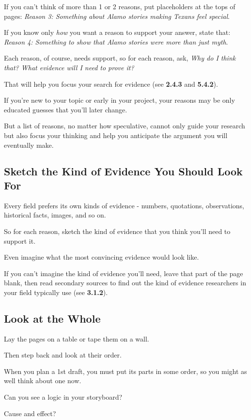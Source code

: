 \documentclass[oneside]{book}
\numberwithin{equation}{section}
\begin{document}
%
If you can't think of more than 1 or 2 reasons, put placeholders at the tops of pages: \textit{Reason 3: Something about Alamo stories making Texans feel special}.

If you know only \textit{how} you want a reason to support your answer, state that: \textit{Reason 4: Something to show that Alamo stories were more than just myth}.

Each reason, of course, needs support, so for each reason, ask, \textit{Why do I think that? What evidence will I need to prove it?}

That will help you focus your search for evidence (see \textbf{2.4.3} and \textbf{5.4.2}).

%
If you're new to your topic or early in your project, your reasons may be only educated guesses that you'll later change.

But a list of reasons, no matter how speculative, cannot only guide your research but also focus your thinking and help you anticipate the argument you will eventually make.

\subsection{Sketch the Kind of Evidence You Should Look For}
Every field prefers its own kinds of evidence - numbers, quotations, observations, historical facts, images, and so on.

So for each reason, sketch the kind of evidence that you think you'll need to support it.

Even imagine what the most convincing evidence would look like.

If you can't imagine the kind of evidence you'll need, leave that part of the page blank, then read secondary sources to find out the kind of evidence researchers in your field typically use (see \textbf{3.1.2}).

\subsection{Look at the Whole}
Lay the pages on a table or tape them on a wall.

Then step back and look at their order.

When you plan a 1st draft, you must put its parts in some order, so you might as well think about one now.

Can you see a logic in your storyboard?

Cause and effect?
\end{document}
